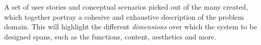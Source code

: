 \begin{definition} \label{def:scenario_corpus} 
  A set of user stories and conceptual scenarios picked out of the many created, which together portray a cohesive and exhaustive description of the problem domain. This will highlight the different \emph{dimensions} over which the system to be designed spans, such as the functions, content, aesthetics and more. \cite[p. 67-68]{benyon_14}
\end{definition}